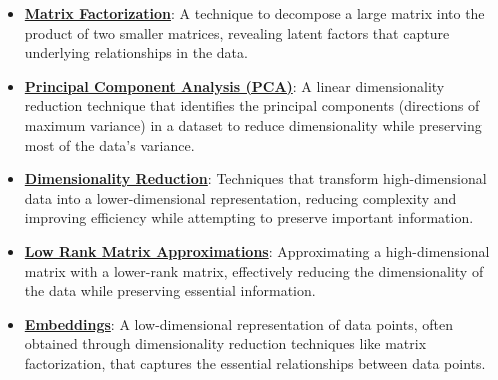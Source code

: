 \documentclass{article}%
\begin{document}
\begin{itemize}[leftmargin=*]%
\item \href{https://purdue.brightspace.com/d2l/common/assets/pdfjs-d2l-dist/1.0.14-legacy/web/viewer.html?file=\%2Fcontent\%2Fenforced\%2F1095467-wl.202510.CS.24300.001\%2F11L2-svd-pca-recommender.pdf\%3Fou\%3D1095467\&lang=en-us\&container=d2l-fileviewer-rendered-pdf\&fullscreen=d2l-fileviewer-rendered-pdf-dialog\&height=667#page=2}{\textbf{Matrix Factorization}}: A technique to decompose a large matrix into the product of two smaller matrices, revealing latent factors that capture underlying relationships in the data.%
\item \href{https://purdue.brightspace.com/d2l/common/assets/pdfjs-d2l-dist/1.0.14-legacy/web/viewer.html?file=\%2Fcontent\%2Fenforced\%2F1095467-wl.202510.CS.24300.001\%2F11L2-svd-pca-recommender.pdf\%3Fou\%3D1095467\&lang=en-us\&container=d2l-fileviewer-rendered-pdf\&fullscreen=d2l-fileviewer-rendered-pdf-dialog\&height=667#page=8}{\textbf{Principal Component Analysis (PCA)}}: A linear dimensionality reduction technique that identifies the principal components (directions of maximum variance) in a dataset to reduce dimensionality while preserving most of the data's variance.%
\item \href{https://purdue.brightspace.com/d2l/common/assets/pdfjs-d2l-dist/1.0.14-legacy/web/viewer.html?file=\%2Fcontent\%2Fenforced\%2F1095467-wl.202510.CS.24300.001\%2F11L2-svd-pca-recommender.pdf\%3Fou\%3D1095467\&lang=en-us\&container=d2l-fileviewer-rendered-pdf\&fullscreen=d2l-fileviewer-rendered-pdf-dialog\&height=667#page=8}{\textbf{Dimensionality Reduction}}: Techniques that transform high-dimensional data into a lower-dimensional representation, reducing complexity and improving efficiency while attempting to preserve important information.%
\item \href{https://purdue.brightspace.com/d2l/common/assets/pdfjs-d2l-dist/1.0.14-legacy/web/viewer.html?file=\%2Fcontent\%2Fenforced\%2F1095467-wl.202510.CS.24300.001\%2F11L2-svd-pca-recommender.pdf\%3Fou\%3D1095467\&lang=en-us\&container=d2l-fileviewer-rendered-pdf\&fullscreen=d2l-fileviewer-rendered-pdf-dialog\&height=667#page=9}{\textbf{Low Rank Matrix Approximations}}: Approximating a high-dimensional matrix with a lower-rank matrix, effectively reducing the dimensionality of the data while preserving essential information.%
\item \href{https://purdue.brightspace.com/d2l/common/assets/pdfjs-d2l-dist/1.0.14-legacy/web/viewer.html?file=\%2Fcontent\%2Fenforced\%2F1095467-wl.202510.CS.24300.001\%2F11L2-svd-pca-recommender.pdf\%3Fou\%3D1095467\&lang=en-us\&container=d2l-fileviewer-rendered-pdf\&fullscreen=d2l-fileviewer-rendered-pdf-dialog\&height=667#page=5}{\textbf{Embeddings}}: A low-dimensional representation of data points, often obtained through dimensionality reduction techniques like matrix factorization, that captures the essential relationships between data points.%

\end{itemize}
\end{document}
